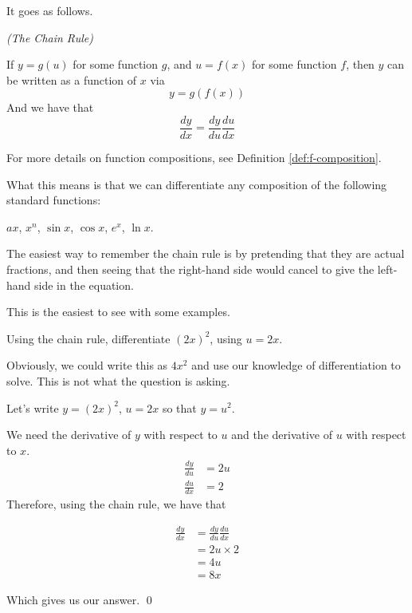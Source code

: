 It goes as follows. 
\begin{theorem} \emph{(The Chain Rule)}

    If $y = g(u)$ for some function $g$, and $u = f(x)$ for some function $f$, then $y$ can be written as a function of $x$ via 
    \[y = g(f(x))\]
    And we have that 
    \[ \frac{dy}{dx} = \frac{dy}{du} \frac{du}{dx}\]
\end{theorem}

For more details on function compositions, see Definition \ref{def:f-composition}.

What this means is that we can differentiate any composition of the following standard functions:

$ax$, $x^n$, $\sin x$, $\cos x$, $e^x$, $\ln x$.

The easiest way to remember the chain rule is by pretending that they are actual fractions, and then seeing that the right-hand side would cancel to give the 
left-hand side in the equation.

This is the easiest to see with some examples.

\begin{example}
    Using the chain rule, differentiate $(2x)^2$, using $u = 2x$.
\end{example}
\begin{solution}
    Obviously, we could write this as $4x^2$ and use our knowledge of differentiation to solve. This is not what the question is asking.

    Let's write $y = (2x)^2$, $u = 2x$ so that $y = u^2$.

    We need the derivative of $y$ with respect to $u$ and the derivative of $u$ with respect to $x$.
    \begin{align*}
        \frac{dy}{du} &= 2u \tag{using the derivative of $u^2$} \\
        \frac{du}{dx} &= 2 \tag{using the derivative of $2x$}
    \end{align*}
    Therefore, using the chain rule, we have that 

    \begin{align*}
        \frac{dy}{dx} &= \frac{dy}{du} \frac{du}{dx} \\
         &= 2u \times 2 \\
         &= 4u \\
         &= 8x \tag{using $u = 2x$}
    \end{align*}

    Which gives us our answer.
    \qed
\end{solution}

